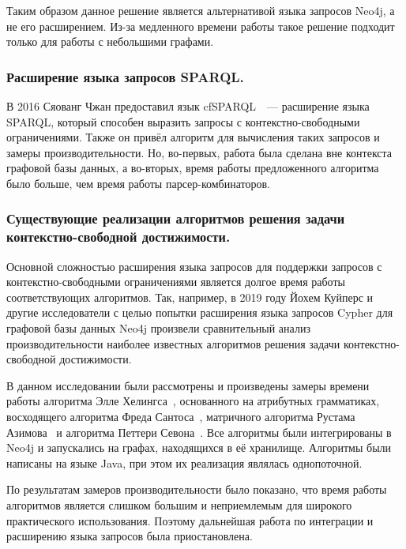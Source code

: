 Таким образом данное решение является альтернативой языка запросов Neo4j, а не его расширением. Из-за медленного времени работы такое решение подходит только для работы с небольшими графами. 

\subsubsection{Расширение языка запросов SPARQL.}\label{subsection:cypher-extention-2}
В 2016 Сяованг Чжан предоставил язык cfSPARQL~\cite{zhlang-2016}~--- расширение языка SPARQL, который способен выразить запросы с контекстно-свободными ограничениями. Также он привёл алгоритм для вычисления таких запросов и замеры производительности. Но, во-первых, работа была сделана вне контекста графовой базы данных, а во-вторых, время работы предложенного алгоритма было больше, чем время работы парсер-комбинаторов.

\subsubsection{Существующие реализации алгоритмов решения задачи контекстно-свободной достижимости.}
Основной сложностью расширения языка запросов для поддержки запросов с контекстно-свободными ограничениями является долгое время работы соответствующих алгоритмов. Так, например, в 2019 году Йохем Куйперс и другие исследователи с целью попытки расширения языка запросов Cypher для графовой базы данных Neo4j произвели сравнительный анализ производительности наиболее известных алгоритмов решения задачи контекстно-свободной достижимости.

В данном исследовании были рассмотрены и произведены замеры времени работы алгоритма Элле Хелингса~\cite{hellings-2015}, основанного на атрибутных грамматиках, восходящего алгоритма Фреда Сантоса~\cite{santos-2018}, матричного алгоритма Рустама Азимова~\cite{Azimov:2018:CPQ:3210259.3210264} и алгоритма Петтери Севона~\cite{bio-application}. Все алгоритмы были интегрированы в Neo4j и запускались на графах, находящихся в её хранилище. Алгоритмы были написаны на языке Java, при этом их реализация являлась однопоточной.


По результатам замеров производительности было показано, что время работы алгоритмов является слишком большим и неприемлемым для широкого практического использования. Поэтому дальнейшая работа по интеграции и расширению языка запросов была приостановлена.

